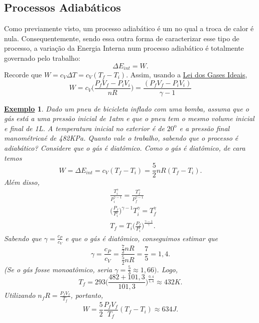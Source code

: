 \documentclass{article}
\newtheorem{example}{\underline{Exemplo}}
\begin{document}
\subsection{Processos Adiabáticos}
Como previamente visto, um processo adiabático é um no qual a troca de calor é nula. Consequentemente,
sendo essa outra forma de caracterizar esse tipo de processo, a variação da Energia Interna num processo
adiabático é totalmente governado pelo trabalho:
\[
  \Delta E_{int} = W.
\]
Recorde que \(W=c_{V}\Delta T = c_{V}(T_{f}-T_{i})\). Assim, usando a \hyperlink{pvnrt}{Lei dos Gases Ideais},
\[
  W = c_{V}\biggl(\frac{P_{f}V_{f}-P_{i}V_{i}}{nR}\biggr) = \frac{(P_{f}V_{f}-P_{i}V_{i})}{\gamma -1}
\]
\begin{example}
  Dado um pneu de bicicleta inflado com uma bomba, assuma que o gás está a uma pressão inicial de 1atm e que o pneu tem o mesmo volume
  inicial e final de 1L. A temperatura inicial no exterior é de \(20^{\mathrm{o}}\) e a pressão final manométrica\footnotemark[1]é de 482KPa. Quanto
  vale o trabalho, sabendo que o processo é adiabático? Considere que o gás é diatômico.
  Como o gás é diatômico, de cara temos 
  \[
    W = \Delta E_{int} = c_{V}(T_{f}-T_{i}) = \frac{5}{2}nR(T_{f}-T_{i}).
  \]
  Além disso, 
  \begin{align*}
   &\frac{T_{i}^{\gamma }}{P_{i}^{\gamma -1}}=\frac{T_{f}^{\gamma }}{P_{f}^{\gamma -1}}\\
   &\biggl(\frac{P_{f}}{P_{i}}\biggr)^{\gamma -1}T_{i}^{\gamma } = T_{f}^{\gamma }\\
   &T_{f}=T_{i}\biggl(\frac{P_{f}}{P_{i}}\biggr)^{\frac{\gamma -1}{\gamma }}.
  \end{align*}
  Sabendo que \(\gamma  = \frac{c_{P}}{c_{V}}\) e que o gás é diatômico, conseguimos estimar que 
  \[
    \gamma  = \frac{c_{P}}{c_{V}} = \frac{\frac{7}{2}nR}{\frac{5}{2}nR} = \frac{7}{5} = 1,4.
  \]
  (Se o gás fosse monoatômico, seria \(\gamma = \frac{5}{3}\approx 1,66)\). Logo,
  \[
    T_{f} = 293 \biggl(\frac{482 + 101,3}{101,3}\biggr)^{\frac{0,4}{1,4}}\approx 432K.
  \]
  Utilizando \(n_{f}R = \frac{P_{f}V_{f}}{T_{f}}\), portanto,
  \[
    W = \frac{5}{2}\frac{P_{f}V_{f}}{T_{f}}(T_{f}-T_{i})\approx 634J.
  \]
\end{example}
\end{document}
